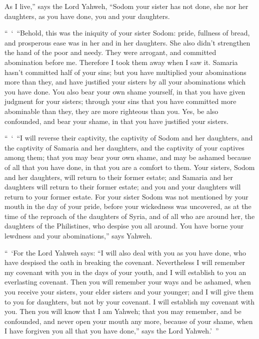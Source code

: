 {As I live,” says the Lord Yahweh, “Sodom your sister has not done, she nor her daughters, as you have done, you and your daughters.
\par }{\PP {}“ ‘ “Behold, this was the iniquity of your sister Sodom: pride, fullness of bread, and prosperous ease was in her and in her daughters. She also didn’t strengthen the hand of the poor and needy.
They were arrogant, and committed abomination before me. Therefore I took them away when I saw it.
Samaria hasn’t committed half of your sins; but you have multiplied your abominations more than they, and have justified your sisters by all your abominations which you have done.
You also bear your own shame yourself, in that you have given judgment for your sisters; through your sins that you have committed more abominable than they, they are more righteous than you. Yes, be also confounded, and bear your shame, in that you have justified your sisters.
\par }{\PP {}“ ‘ “I will reverse their captivity, the captivity of Sodom and her daughters, and the captivity of Samaria and her daughters, and the captivity of your captives among them;
that you may bear your own shame, and may be ashamed because of all that you have done, in that you are a comfort to them.
Your sisters, Sodom and her daughters, will return to their former estate; and Samaria and her daughters will return to their former estate; and you and your daughters will return to your former estate.
For your sister Sodom was not mentioned by your mouth in the day of your pride,
before your wickedness was uncovered, as at the time of the reproach of the daughters of Syria, and of all who are around her, the daughters of the Philistines, who despise you all around.
You have borne your lewdness and your abominations,” says Yahweh.
\par }{\PP {}“ ‘For the Lord Yahweh says: “I will also deal with you as you have done, who have despised the oath in breaking the covenant.
Nevertheless I will remember my covenant with you in the days of your youth, and I will establish to you an everlasting covenant.
Then you will remember your ways and be ashamed, when you receive your sisters, your elder sisters and your younger; and I will give them to you for daughters, but not by your covenant.
I will establish my covenant with you. Then you will know that I am Yahweh;
that you may remember, and be confounded, and never open your mouth any more, because of your shame, when I have forgiven you all that you have done,” says the Lord Yahweh.’ ”

}
